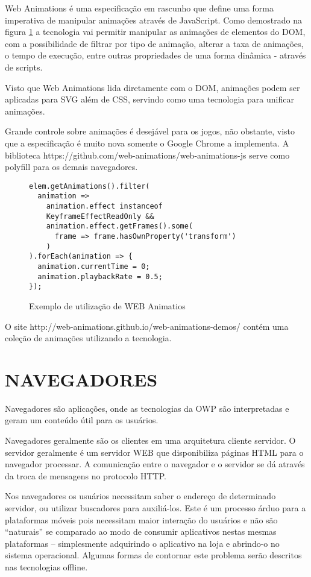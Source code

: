 Web Animations é uma especificação em rascunho que define uma forma
imperativa de manipular animações através de JavaScript. Como
demostrado na figura \ref{fig:webAnimations} a tecnologia vai permitir
manipular as animações de elementos do DOM, com a possibilidade de 
filtrar por tipo de animação, alterar a taxa de
animações, o tempo de execução, entre outras propriedades de uma
forma dinâmica - através de scripts.

Visto que Web Animations lida diretamente com o DOM, animações podem
ser aplicadas para SVG além de CSS, servindo como uma tecnologia para
unificar animações.

Grande controle sobre animações é desejável para os jogos, não obstante,
visto que a especificação é muito nova somente o Google Chrome a implementa.
A biblioteca https://github.com/web-animations/web-animations-js serve
como polyfill para os demais navegadores.

\begin{figure}
    \centering
    \begin{verbatim}
elem.getAnimations().filter(
  animation =>
    animation.effect instanceof 
    KeyframeEffectReadOnly &&
    animation.effect.getFrames().some(
      frame => frame.hasOwnProperty('transform')
    )
).forEach(animation => {
  animation.currentTime = 0;
  animation.playbackRate = 0.5;
});
    \end{verbatim}
	\caption{Exemplo de utilização de WEB Animatios}
    \label{fig:webAnimations}
\end{figure}

O site http://web-animations.github.io/web-animations-demos/ contém uma
coleção de animações utilizando a tecnologia.

\section{NAVEGADORES}
Navegadores são aplicações, onde as tecnologias da OWP são
interpretadas e geram um conteúdo útil para os usuários.

Navegadores geralmente são os clientes em uma arquitetura cliente
servidor. O servidor geralmente é um servidor WEB que disponibiliza
páginas HTML para o navegador processar. A comunicação entre o 
navegador e o servidor se dá através da troca de mensagens no protocolo
HTTP.

Nos navegadores os usuários necessitam saber o endereço de determinado
servidor, ou utilizar buscadores para auxiliá-los. Este é um processo
árduo para a plataformas móveis pois necessitam maior interação
do usuários e não são “naturais” se comparado ao modo 
de consumir aplicativos nestas mesmas plataformas – simplesmente
adquirindo o aplicativo na loja e abrindo-o no sistema operacional.
Algumas formas de contornar este problema serão descritos nas tecnologias offline.

